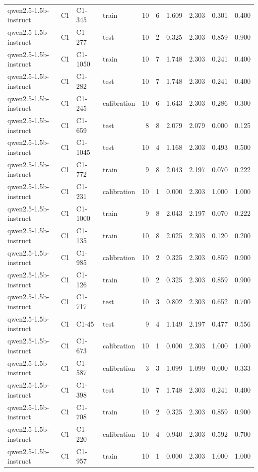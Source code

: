 \begin{table}
\begin{tabular}{llllrrrrrr}
qwen2.5-1.5b-instruct & C1 & C1-345 & train & 10 & 6 & 1.609 & 2.303 & 0.301 & 0.400 \\
qwen2.5-1.5b-instruct & C1 & C1-277 & test & 10 & 2 & 0.325 & 2.303 & 0.859 & 0.900 \\
qwen2.5-1.5b-instruct & C1 & C1-1050 & train & 10 & 7 & 1.748 & 2.303 & 0.241 & 0.400 \\
qwen2.5-1.5b-instruct & C1 & C1-282 & test & 10 & 7 & 1.748 & 2.303 & 0.241 & 0.400 \\
qwen2.5-1.5b-instruct & C1 & C1-245 & calibration & 10 & 6 & 1.643 & 2.303 & 0.286 & 0.300 \\
qwen2.5-1.5b-instruct & C1 & C1-659 & test & 8 & 8 & 2.079 & 2.079 & 0.000 & 0.125 \\
qwen2.5-1.5b-instruct & C1 & C1-1045 & test & 10 & 4 & 1.168 & 2.303 & 0.493 & 0.500 \\
qwen2.5-1.5b-instruct & C1 & C1-772 & train & 9 & 8 & 2.043 & 2.197 & 0.070 & 0.222 \\
qwen2.5-1.5b-instruct & C1 & C1-231 & calibration & 10 & 1 & 0.000 & 2.303 & 1.000 & 1.000 \\
qwen2.5-1.5b-instruct & C1 & C1-1000 & train & 9 & 8 & 2.043 & 2.197 & 0.070 & 0.222 \\
qwen2.5-1.5b-instruct & C1 & C1-135 & train & 10 & 8 & 2.025 & 2.303 & 0.120 & 0.200 \\
qwen2.5-1.5b-instruct & C1 & C1-985 & calibration & 10 & 2 & 0.325 & 2.303 & 0.859 & 0.900 \\
qwen2.5-1.5b-instruct & C1 & C1-126 & train & 10 & 2 & 0.325 & 2.303 & 0.859 & 0.900 \\
qwen2.5-1.5b-instruct & C1 & C1-717 & test & 10 & 3 & 0.802 & 2.303 & 0.652 & 0.700 \\
qwen2.5-1.5b-instruct & C1 & C1-45 & test & 9 & 4 & 1.149 & 2.197 & 0.477 & 0.556 \\
qwen2.5-1.5b-instruct & C1 & C1-673 & calibration & 10 & 1 & 0.000 & 2.303 & 1.000 & 1.000 \\
qwen2.5-1.5b-instruct & C1 & C1-587 & calibration & 3 & 3 & 1.099 & 1.099 & 0.000 & 0.333 \\
qwen2.5-1.5b-instruct & C1 & C1-398 & test & 10 & 7 & 1.748 & 2.303 & 0.241 & 0.400 \\
qwen2.5-1.5b-instruct & C1 & C1-708 & train & 10 & 2 & 0.325 & 2.303 & 0.859 & 0.900 \\
qwen2.5-1.5b-instruct & C1 & C1-220 & calibration & 10 & 4 & 0.940 & 2.303 & 0.592 & 0.700 \\
qwen2.5-1.5b-instruct & C1 & C1-957 & train & 10 & 1 & 0.000 & 2.303 & 1.000 & 1.000 \\

\end{tabular}
\end{table}
